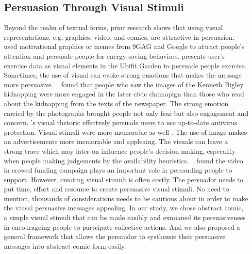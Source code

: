 \subsection{Persuasion Through Visual Stimuli}
Beyond the realm of textual forms, prior research shows that using visual representations, e.g. graphics, video, and comics, are attractive in persuasion. ~\textcite{selker2015sweetbuildinggreeter} used motivational graphics or memes from 9GAG and Google to attract people's attention and persuade people for energy saving behaviors. \textcite{consolvo2008activity} presents user's exercise data as visual elements in the Ubifit Garden to persuade people exercise. Sometimes, the use of visual can evoke strong emotions that makes the message more persuasive. ~\textcite{iyer2006picture} found that people who saw the images of the Kenneth Bigley kidnapping were more engaged in the later civic chamapign than those who read about the kidnapping from the texts of the newspaper. The strong emotion carried by the photographs brought people not only fear but also engagement and concern. \textcite{zhang2014stop}'s visual rhetoric effectvely persuade users to use up-to-date antivirus protection. Visual stimuli were more memorable as well \cite{nisbett1980human}. The use of image makes an advertisements more memoriable and appleaing. The visuals can leave a strong trace which may later on influence people's decision making, especailly when people making judgements by the availability heuristics. ~\textcite{dey2017art} found the video in crowed funding campaign plays an important role in persauding people to support. However, creating visual stimuli is often costly. The persuador needs to put time, effort and resource to create persuasive visual stimuli. No need to mention, thousands of considerations needs to be cautious about in order to make the viusal persuasive messages appealing. In our study, we chose abstract comic, a simple visual stimuli that can be made easibly and exmianed its persuasiveness in encourageing people to partcipate collective actions. And we also proposed a general framework that allows the persaudor to systhezsie their persuasive messages into abstract comic form easily. 


